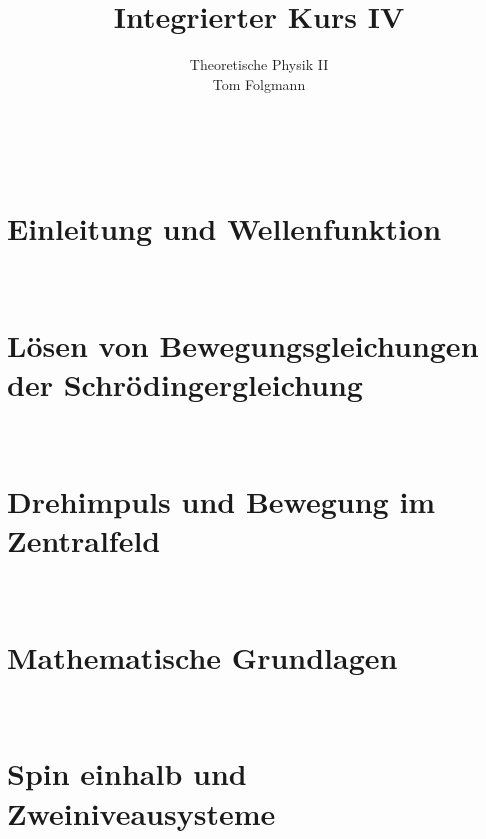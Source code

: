 \documentclass{article}
\title{Integrierter Kurs IV}
\author{Theoretische Physik II\\Tom Folgmann}
\begin{document}
    \maketitle
    \noindent{}
    \tableofcontents
    \thispagestyle{empty}
    \newpage
    \ 
    \thispagestyle{empty}
    \newpage

    \section{Einleitung und Wellenfunktion}
        
        
        
        
        
        
        
        
    
    \clearpage
    \thispagestyle{empty}
    \newpage
    \ 
    \thispagestyle{empty}
    \newpage
    \section{Lösen von Bewegungsgleichungen der Schrödingergleichung}
        
        
        
        

    \clearpage
    \thispagestyle{empty}
    \newpage
    \ 
    \thispagestyle{empty}
    \newpage
    \section{Drehimpuls und Bewegung im Zentralfeld}
        

        
        

    \clearpage
    \thispagestyle{empty}
    \newpage
    \ 
    \thispagestyle{empty}
    \newpage
    \section{Mathematische Grundlagen}
        
        
        
        
        
        
        
        
        
        
        

    \clearpage
    \thispagestyle{empty}
    \newpage
    \ 
    \thispagestyle{empty}
    \newpage
    \section{Spin einhalb und Zweiniveausysteme}    
        
    \newpage
    
\end{document}
